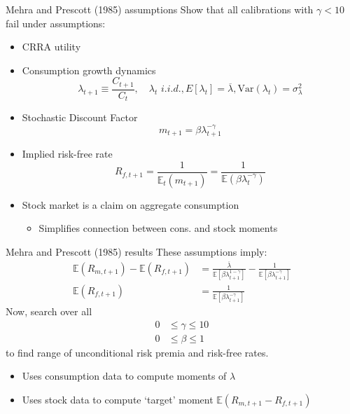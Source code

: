 \documentclass[xcolor=table, aspectratio=169]{beamer}
\newcommand{\E}{\mathbb{E}}
\begin{document}
\begin{frame}{Mehra and Prescott (1985) assumptions}
Show that all calibrations with $\gamma < 10$ fail under assumptions:
\begin{itemize}
\item CRRA utility
\item Consumption growth dynamics
$$\lambda_{t+1} \equiv \frac{C_{t+1}}{C_t}, \hspace{12pt} \lambda_t \hspace{4pt} i.i.d., E [\lambda_t] = \overline{\lambda}, \text{Var}(\lambda_t) = \sigma_\lambda^2$$
\item Stochastic Discount Factor
$$m_{t+1} = \beta \lambda^{-\gamma}_{t+1}$$
\item Implied risk-free rate
$$R_{f,t+1} = \frac{1}{\E_t\left( m_{t+1} \right)} = \frac{1}{\E(\beta \lambda^{-\gamma}_t)}$$
\item Stock market is a claim on aggregate consumption
\begin{itemize}
\item Simplifies connection between cons. and stock moments
\end{itemize}
\end{itemize}
\end{frame}


\begin{frame}{Mehra and Prescott (1985) results}
These assumptions imply:
\begin{align*}
\E ( R_{m,t+1} ) - \E ( R_{f,t+1} ) &= \frac{\overline{\lambda}}{\E \left[ \beta \lambda_{t+1}^{1-\gamma} \right]} - \frac{1}{\E \left[ \beta \lambda_{t+1}^{-\gamma} \right] } \\
\E ( R_{f,t+1} ) &=  \frac{1}{\E \left[ \beta \lambda_{t+1}^{-\gamma} \right] }
\end{align*}
\vskip 12pt
Now, search over all 
\begin{align*}
0 &\leq \gamma \leq 10 \\
0 &\leq \beta \leq 1
\end{align*}
to find range of unconditional risk premia and risk-free rates. 
\begin{itemize}
\item Uses consumption data to compute moments of $\lambda$
\item Uses stock data to compute `target' moment $\E ( R_{m,t+1} -R_{f,t+1} )$
\end{itemize}
\end{frame}
\end{document}
